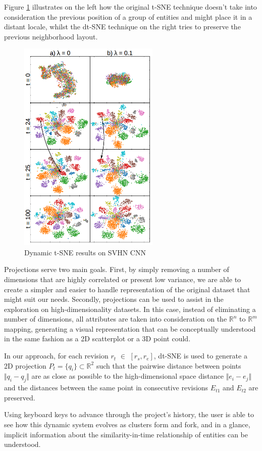 Figure \ref{fig:dtsne} illustrates on the left how the original t-SNE technique doesn't take into consideration the previous position of a group of entities and might place it in a distant locale, whilst the dt-SNE technique on the right tries to preserve the previous neighborhood layout.
\begin{figure}[H]
  \centering
  \includegraphics[width=0.6\textwidth]{figures/dtsne.png}
  \caption{Dynamic t-SNE results on SVHN CNN}
  \label{fig:dtsne}
\end{figure}

Projections serve two main goals. First, by simply removing a number of dimensions that are highly correlated or present low variance, we are able to create a simpler and easier to handle representation of the original dataset that might suit our needs. Secondly, projections can be used to assist in the exploration on high-dimensionality datasets. In this case, instead of eliminating a number of dimensions, all attributes are taken into consideration on the ${\mathbb{R}^{n}}$ to ${\mathbb{R}^{m}}$ mapping, generating a visual representation that can be conceptually understood in the same fashion as a 2D scatterplot or a 3D point could.

In our approach, for each revision $r_{t}$ $\in$ $[r_{s}, r_{e}]$, dt-SNE is used to generate a 2D projection $P_{t} = \{q_{i} \} \subset{\mathbb{R}^{2}}$ such that the pairwise distance between points $\Vert q_{i} - q_{j} \Vert$ are as close as possible to the high-dimensional space distance $\Vert e_{i} - e_{j} \Vert$ and the distances between the same point in consecutive revisions $E_{t1}$ and $E_{t2}$ are preserved.

Using keyboard keys to advance through the project's history, the user is able to see how this dynamic system evolves as clusters form and fork, and in a glance, implicit information about the similarity-in-time relationship of entities can be understood. 
